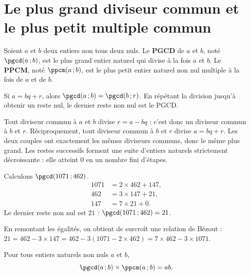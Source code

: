 \section{Le plus grand diviseur commun et le plus petit multiple commun}

\begin{definition}
Soient $a$ et $b$ deux entiers non tous deux nuls. Le \textbf{PGCD} de $a$ et
$b$, noté $\pgcd(a\,;b)$, est le plus grand entier naturel qui divise à la
fois $a$ et $b$. Le \textbf{PPCM}, noté $\ppcm(a\,;b)$, est le plus petit
entier naturel non nul multiple à la fois de $a$ et de $b$.
\end{definition}

\begin{theoreme}
Si $a = bq+r$, alors $\pgcd(a\,;b) = \pgcd(b\,;r)$. En répétant la division
jusqu'à obtenir un reste nul, le dernier reste non nul est le PGCD.
\end{theoreme}

\begin{demonstration}
Tout diviseur commun à $a$ et $b$ divise $r = a-bq$ : c'est donc un diviseur
commun à $b$ et $r$. Réciproquement, tout diviseur commun à $b$ et $r$ divise
$a = bq+r$. Les deux couples ont exactement les mêmes diviseurs communs, donc
le même plus grand. Les restes successifs forment une suite d'entiers naturels
strictement décroissante : elle atteint $0$ en un nombre fini d'étapes.
\end{demonstration}

\begin{exemple}
Calculons $\pgcd(1071\,;462)$.
\[
\begin{aligned}
  1071 &= 2\times462+147, \\
  462  &= 3\times147+21, \\
  147  &= 7\times21+0 .
\end{aligned}
\]
Le dernier reste non nul est $21$ : $\pgcd(1071\,;462) = 21$.

\smallskip
En remontant les égalités, on obtient de surcroît une relation de Bézout :
$21 = 462-3\times147 = 462-3(1071-2\times462) = 7\times462-3\times1071$.
\end{exemple}

\begin{propriete}
Pour tous entiers naturels non nuls $a$ et $b$,
\[
  \pgcd(a\,;b)\times\ppcm(a\,;b) = ab .
\]
\end{propriete}

